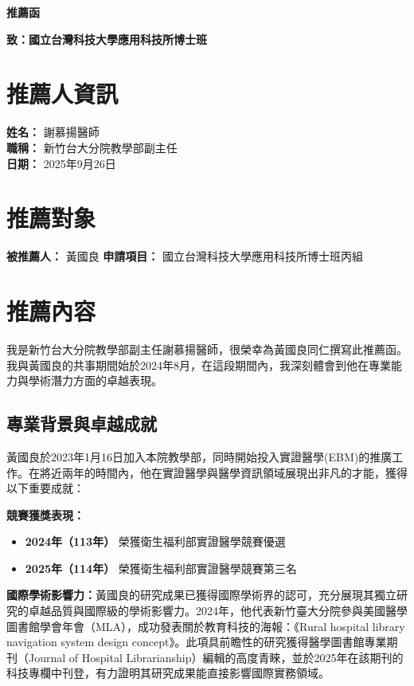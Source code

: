\documentclass[12pt,a4paper]{article}
\begin{document}
\begin{center}
\textbf{\Large 推薦函}
\end{center}

\vspace{0.5cm}

\textbf{致：國立台灣科技大學應用科技所博士班}

\vspace{0.3cm}

\section*{推薦人資訊}
\textbf{姓名：} 謝慕揚醫師\\ \hspace{1cm} \textbf{職稱：} 新竹台大分院教學部副主任\\ \hspace{1cm} \textbf{日期：} 2025年9月26日

\section*{推薦對象}
\textbf{被推薦人：} 黃國良 \hspace{1cm} \textbf{申請項目：} 國立台灣科技大學應用科技所博士班丙組

\section*{推薦內容}

我是新竹台大分院教學部副主任謝慕揚醫師，很榮幸為黃國良同仁撰寫此推薦函。我與黃國良的共事期間始於2024年8月，在這段期間內，我深刻體會到他在專業能力與學術潛力方面的卓越表現。

\subsection*{專業背景與卓越成就}

黃國良於2023年1月16日加入本院教學部，同時開始投入實證醫學(EBM)的推廣工作。在將近兩年的時間內，他在實證醫學與醫學資訊領域展現出非凡的才能，獲得以下重要成就：

\textbf{競賽獲獎表現：}
\begin{itemize}[leftmargin=*]
    \item \textbf{2024年（113年）} 榮獲衛生福利部實證醫學競賽優選
    \item \textbf{2025年（114年）} 榮獲衛生福利部實證醫學競賽第三名
\end{itemize}

\textbf{國際學術影響力：}黃國良的研究成果已獲得國際學術界的認可，充分展現其獨立研究的卓越品質與國際級的學術影響力。2024年，他代表新竹臺大分院參與美國醫學圖書館學會年會（MLA），成功發表關於教育科技的海報：《Rural hospital library navigation system design concept》。此項具前瞻性的研究獲得醫學圖書館專業期刊（Journal of Hospital Librarianship）編輯的高度青睞，並於2025年在該期刊的科技專欄中刊登，有力證明其研究成果能直接影響國際實務領域。
\end{document}
